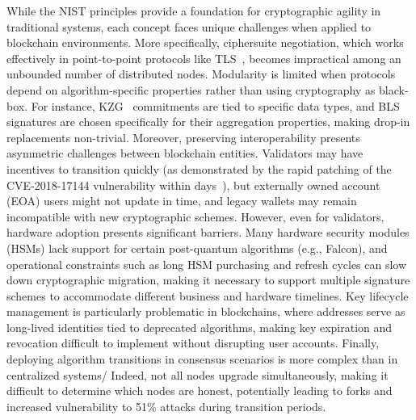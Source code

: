 While the NIST principles provide a foundation for cryptographic agility in traditional systems, each concept faces unique challenges when applied to blockchain environments. 
More specifically, ciphersuite negotiation, which works effectively in point-to-point protocols like TLS~\cite{}, becomes impractical among an unbounded number of distributed nodes. 
Modularity is limited when protocols depend on algorithm-specific properties rather than using cryptography as black-box. 
For instance, KZG~\cite{} commitments are tied to specific data types, and BLS~\cite{} signatures are chosen specifically for their aggregation properties, making drop-in replacements non-trivial.
Moreover, preserving interoperability presents asymmetric challenges between blockchain entities. 
Validators may have incentives to transition quickly (as demonstrated by the rapid patching of the CVE-2018-17144 vulnerability within days~\cite{}), but externally owned account (EOA) users might not update in time, and legacy wallets may remain incompatible with new cryptographic schemes. 
However, even for validators, hardware adoption presents significant barriers.
Many hardware security modules (HSMs) lack support for certain post-quantum algorithms (e.g., Falcon), and operational constraints such as long HSM purchasing and refresh cycles can slow down cryptographic migration, making it necessary to support multiple signature schemes to accommodate different business and hardware timelines.
Key lifecycle management is particularly problematic in blockchains, where addresses serve as long-lived identities tied to deprecated algorithms, making key expiration and revocation difficult to implement without disrupting user accounts. 
Finally, deploying algorithm transitions in consensus scenarios is more complex than in centralized systems/
Indeed, not all nodes upgrade simultaneously, making it difficult to determine which nodes are honest, potentially leading to forks and increased vulnerability to 51\% attacks during transition periods. 




